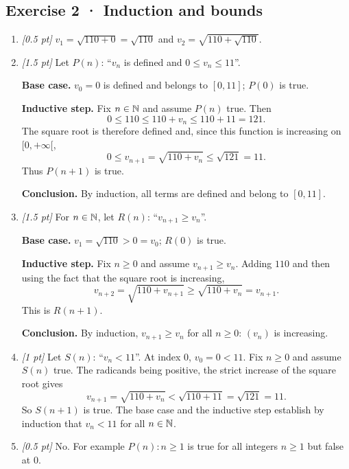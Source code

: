 \subsection*{Exercise 2 · Induction and bounds}\begin{enumerate}

\item \textit{[0.5 pt]} $v_1=\sqrt{110+0}=\sqrt{110}$ and $v_2=\sqrt{110+\sqrt{110}}$.

\item \textit{[1.5 pt]} Let $P(n)$: ``$v_n$ is defined and $0\le v_n\le 11$''.
\par\smallskip\textbf{Base case.} $v_0=0$ is defined and belongs to $[0,11]$; $P(0)$ is true.
\par\smallskip\textbf{Inductive step.} Fix $n\in\mathbb N$ and assume $P(n)$ true. Then
\[0\le 110\le 110+v_n\le 110+11=121.\]
The square root is therefore defined and, since this function is increasing on $[0,+\infty[$,
\[0\le v_{n+1}=\sqrt{110+v_n}\le\sqrt{121}=11.\]
Thus $P(n+1)$ is true.
\par\smallskip\textbf{Conclusion.} By induction, all terms are defined and belong to $[0,11]$.

\item \textit{[1.5 pt]} For $n\in\mathbb N$, let $R(n)$: ``$v_{n+1}\ge v_n$''.
\par\smallskip\textbf{Base case.} $v_1=\sqrt{110}>0=v_0$; $R(0)$ is true.
\par\smallskip\textbf{Inductive step.} Fix $n\ge0$ and assume $v_{n+1}\ge v_n$. Adding $110$ and then using the fact that the square root is increasing,
\[v_{n+2}=\sqrt{110+v_{n+1}}\ge\sqrt{110+v_n}=v_{n+1}.\]
This is $R(n+1)$.
\par\smallskip\textbf{Conclusion.} By induction, $v_{n+1}\ge v_n$ for all $n\ge0$: $(v_n)$ is increasing.

\item \textit{[1 pt]} Let $S(n)$: ``$v_n<11$''. At index $0$, $v_0=0<11$.
Fix $n\ge0$ and assume $S(n)$ true. The radicands being positive, the strict increase of the square root gives
\[v_{n+1}=\sqrt{110+v_n}<\sqrt{110+11}=\sqrt{121}=11.\]
So $S(n+1)$ is true. The base case and the inductive step establish by induction that $v_n<11$ for all $n\in\mathbb N$.

\item \textit{[0.5 pt]} No. For example $P(n):n\ge1$ is true for all integers $n\ge1$ but false at $0$.

\end{enumerate}

